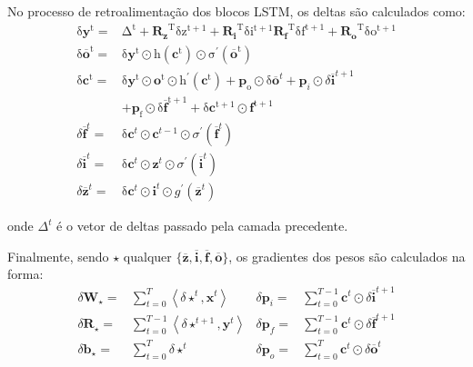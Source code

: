 No processo de retroalimentação dos blocos LSTM, os deltas são calculados como:
\begin{equation}
\begin{array}{ll}
\mathrm{\delta \mathbf{y}^t =} & \mathrm{\Delta^t + \mathbf{R_z}^T \delta z^{t+1} + \mathbf{R_i}^T \delta i^{t+1} \mathbf{R_f}^T\delta f^{t+1} + \mathbf{R_o}^T \delta o^{t+1} }\\

\mathrm{\delta \overline{\mathbf{o}}^{t}=}&\mathrm{\delta \mathbf{y}^{t} \odot h\left(\mathbf{c}^{t}\right) \odot \sigma^{\prime}\left(\overline{\mathbf{o}}^{t}\right)}\\

\mathrm{ \delta \mathbf{c}^{t}=}&\mathrm{ \delta \mathbf{y}^{t} \odot \mathbf{o}^{t} \odot h^{\prime}\left(\mathbf{c}^{t}\right)+\mathbf{p}_{o} \odot \delta} \overline{\mathbf{o}}^{t}+\mathbf{p}_{i} \odot \delta \overline{\mathbf{i}}^{t+1} \\ &\mathrm{+\mathbf{p}_{f} \odot \delta \overline{\mathbf{f}}^{t+1}+\delta \mathbf{c}^{t+1} \odot \mathbf{f}^{t+1} }\\

\delta \overline{\mathbf{f}}^{t}=&\mathrm\delta \mathbf{c}^{t} \odot \mathbf{c}^{t-1} \odot \sigma^{\prime}\left(\overline{\mathbf{f}}^{t}\right) \\

\delta \overline{\mathbf{i}}^{t}=&\mathrm\delta \mathbf{c}^{t} \odot \mathbf{z}^{t} \odot \sigma^{\prime}\left(\overline{\mathbf{i}}^{t}\right) \\

\delta \overline{\mathbf{z}}^{t}=&\mathrm\delta \mathbf{c}^{t} \odot \mathbf{i}^{t} \odot g^{\prime}\left(\overline{\mathbf{z}}^{t}\right)

\end{array}
\end{equation}

\noindent onde $\Delta^t$ é o vetor de deltas passado pela camada precedente. 

Finalmente, sendo $\star$ qualquer $\{ \overline{\mathbf{z}}, \overline{\mathbf{i}}, \overline{\mathbf{f}}, \overline{\mathbf{o}} \}$, os gradientes dos pesos são calculados na forma:
\begin{equation}
\begin{array}{llll} 
\delta \mathbf{W}_{\star}= 	&\sum_{t=0}^{T}\left\langle\delta \star^{t}, \mathbf{x}^{t}\right\rangle 		& \delta \mathbf{p}_{i}=& \sum_{t=0}^{T-1} \mathbf{c}^{t} \odot \delta \overline{\mathbf{i}}^{t+1} \\
\delta \mathbf{R}_{\star}=	& \sum_{t=0}^{T-1}\left\langle\delta \star^{t+1}, \mathbf{y}^{t}\right\rangle 	& \delta \mathbf{p}_{f}=& \sum_{t=0}^{T-1} \mathbf{c}^{t} \odot \delta \overline{\mathbf{f}}^{t+1} \\
\delta \mathbf{b}_{\star}=	& \sum_{t=0}^{T} \delta \star^{t} 												& \delta \mathbf{p}_{o}=& \sum_{t=0}^{T} \mathbf{c}^{t} \odot \delta \overline{\mathbf{o}}^{t}
\end{array}
\end{equation}

